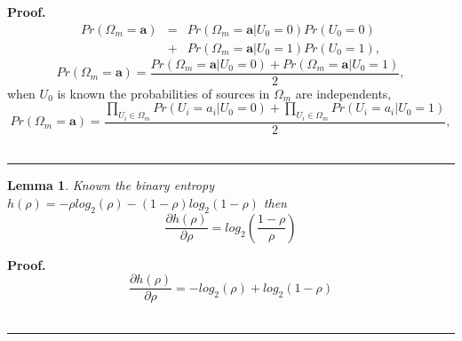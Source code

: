 \documentclass[a4paper,10pt]{article}
\newtheorem{mylemma}[mytheorem]{Lemma}
\newenvironment{myproof}[1][Proof]{\textbf{#1.} }{\ \rule{0.5em}{0.5em}}
\begin{document}
\begin{myproof}
 \label{proof:PrA} 
\begin{equation}\label{eq:PA1}
\begin{matrix}
Pr(\Omega_m=\mathbf{a})&=&Pr(\Omega_m=\mathbf{a}|U_0=0)Pr(U_0=0)\\
~                 &+&Pr(\Omega_m=\mathbf{a}|U_0=1)Pr(U_0=1), 
\end{matrix}
\end{equation}
\begin{equation}\label{eq:PA2}
Pr(\Omega_m=\mathbf{a})=\frac{Pr(\Omega_m=\mathbf{a}|U_0=0)+Pr(\Omega_m=\mathbf{a}|U_0=1)}{2},
\end{equation}
when $U_0$ is known the probabilities of sources in $\Omega_m$ are independents,
\begin{equation}\label{eq:PA3}
Pr(\Omega_m=\mathbf{a})=\frac{\prod \limits_{U_i\in \Omega_m}{Pr(U_i=a_i|U_0=0)}+\prod \limits_{U_i\in \Omega_m}{Pr(U_i=a_i|U_0=1)}}{2},
\end{equation}
\end{myproof}
\begin{mdframed}[style=MDFStyGrayScreen]
\begin{mylemma}
 \label{lemm:dhdrho}
Known the binary entropy $h(\rho)=-\rho log_2(\rho)-(1-\rho) log_2(1-\rho)$ then
\begin{equation}\label{eq:dhdrho1}
 \frac{\partial h(\rho)}{\partial \rho}= log_2 \left( \frac{1-\rho}{\rho} \right )
\end{equation}
\end{mylemma}
\end{mdframed}

\begin{myproof}
 \label{proof:dhdrho} 
\begin{equation}\label{eq:dhdrho2}
 \frac{\partial h(\rho)}{\partial \rho}= - log_2(\rho)+ log_2(1-\rho)
\end{equation}
\end{myproof}
\end{document}
